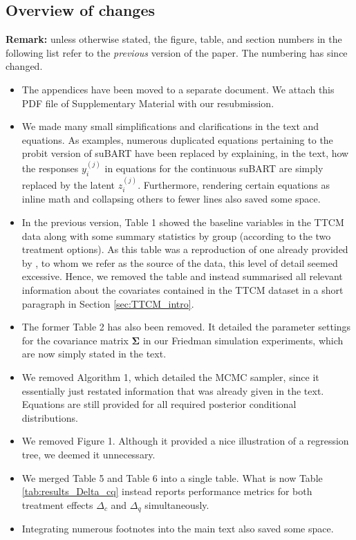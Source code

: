 \documentclass{article}
\begin{document}
\subsection*{Overview of changes}
\textbf{Remark:} unless otherwise stated, the figure, table, and section numbers in the following list refer to the \textit{previous} version of the paper. The numbering has since changed.
\begin{itemize}[wide,itemsep=2pt]
\item The appendices have been moved to a separate document. We attach this PDF file of Supplementary Material with our resubmission.
\item We made many small simplifications and clarifications in the text and equations. As examples, numerous duplicated equations pertaining to the probit version of suBART have been replaced by explaining, in the text, how the responses $y_i^{(j)}$ in equations for the continuous suBART are simply replaced by the latent $z_i^{(j)}$. Furthermore, rendering certain equations as inline math and collapsing others to fewer lines also saved some space.
\item In the previous version, Table 1 showed the baseline variables in the TTCM data along with some summary statistics by group (according to the two treatment options). As this table was a reproduction of one already provided by \citet{wiertsema2019cost}, to whom we refer as the source of the data, this level of detail seemed excessive. Hence, we removed the table and instead summarised all relevant information about the covariates contained in the TTCM dataset in a short paragraph in Section \ref{sec:TTCM_intro}.
\item The former Table 2 has also been removed. It detailed the parameter settings for the covariance matrix $\boldsymbol{\Sigma}$ in our Friedman simulation experiments, which are now simply stated in the text.
\item We removed Algorithm 1, which detailed the MCMC sampler, since it essentially just restated information that was already given in the text. Equations are still provided for all required posterior conditional distributions.
\item We removed Figure 1. Although it provided a nice illustration of a regression tree, we deemed it unnecessary. 
\item We merged Table 5 and Table 6 into a single table. What is now Table \ref{tab:results_Delta_cq} instead reports performance metrics for both treatment effects $\Delta_c$ and $\Delta_q$ simultaneously.
\item Integrating numerous footnotes into the main text also saved some space.
\end{itemize}

\small


\end{document}
